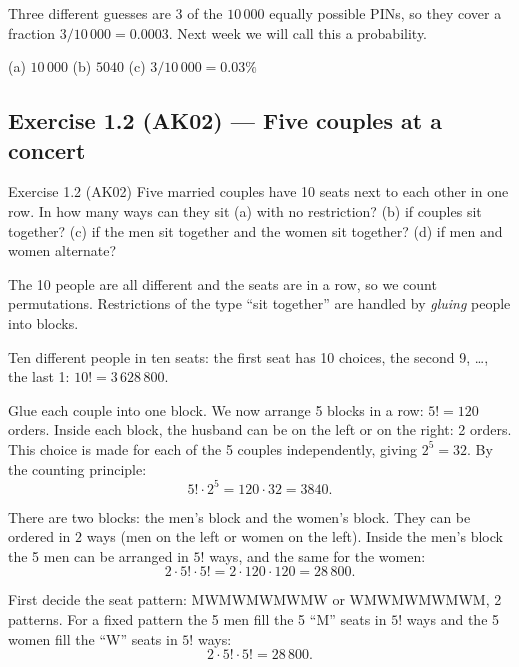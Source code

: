 	 Three different guesses are 3 of the $10\,000$ equally possible
	PINs, so they cover a fraction $3/10\,000 = 0.0003$. Next week we will call
	this a probability.

	\begin{answer}
		(a) $10\,000$ \qquad (b) $5040$ \qquad (c) $3/10\,000=0.03\%$
	\end{answer}
\fi

\subsection{Exercise 1.2 (AK02) --- Five couples at a concert}

\begin{task}{Exercise 1.2 (AK02)}
	Five married couples have 10 seats next to each other in one row. In how
	many ways can they sit (a) with no restriction? (b) if couples sit
	together? (c) if the men sit together and the women sit together? (d) if
	men and women alternate?
\end{task}
\workspace{4cm}

\ifsolutions
	\soltitle
	\idea The 10 people are all different and the seats are in a row, so we count
	permutations. Restrictions of the type ``sit together'' are handled by
	\emph{gluing} people into blocks.

	 Ten different people in ten seats: the first seat has 10 choices,
	the second 9, \ldots, the last 1:
	$10! = 3\,628\,800$.

	 Glue each couple into one block. We now arrange
	5 blocks in a row: $5!=120$ orders. Inside each block, the husband can be on
	the left or on the right: 2 orders. This choice is made for each of the 5
	couples independently, giving $2^5=32$. By the counting principle:
	\[ 5!\cdot2^5 = 120\cdot32 = 3840. \]

	 There are two blocks: the men's
	block and the women's block. They can be ordered in $2$ ways (men on the left
	or women on the left). Inside the men's block the 5 men can be arranged in
	$5!$ ways, and the same for the women:
	\[ 2\cdot5!\cdot5! = 2\cdot120\cdot120 = 28\,800. \]

	 First decide the seat pattern: MWMWMWMWMW or
	WMWMWMWMWM, 2 patterns. For a fixed pattern the 5 men fill the 5 ``M'' seats
	in $5!$ ways and the 5 women fill the ``W'' seats in $5!$ ways:
	\[ 2\cdot5!\cdot5! = 28\,800. \]

